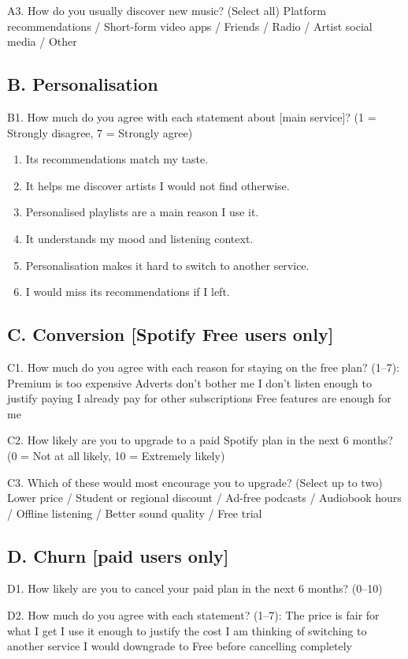 \documentclass[11pt,a4paper]{article}
\begin{document}
A3. How do you usually discover new music? (Select all) Platform recommendations / Short-form video apps / Friends / Radio / Artist social media / Other

\subsection*{B. Personalisation}
B1. How much do you agree with each statement about [main service]? (1 = Strongly disagree, 7 = Strongly agree)

\begin{enumerate}
\item Its recommendations match my taste.
\item It helps me discover artists I would not find otherwise.
\item Personalised playlists are a main reason I use it.
\item It understands my mood and listening context.
\item Personalisation makes it hard to switch to another service.
\item I would miss its recommendations if I left.
\end{enumerate}
\subsection*{C. Conversion [Spotify Free users only]}
C1. How much do you agree with each reason for staying on the free plan? (1–7): Premium is too expensive \textperiodcentered{} Adverts don't bother me \textperiodcentered{} I don't listen enough to justify paying \textperiodcentered{} I already pay for other subscriptions \textperiodcentered{} Free features are enough for me

C2. How likely are you to upgrade to a paid Spotify plan in the next 6 months? (0 = Not at all likely, 10 = Extremely likely)

C3. Which of these would most encourage you to upgrade? (Select up to two) Lower price / Student or regional discount / Ad-free podcasts / Audiobook hours / Offline listening / Better sound quality / Free trial

\subsection*{D. Churn [paid users only]}
D1. How likely are you to cancel your paid plan in the next 6 months? (0–10)

D2. How much do you agree with each statement? (1–7): The price is fair for what I get \textperiodcentered{} I use it enough to justify the cost \textperiodcentered{} I am thinking of switching to another service \textperiodcentered{} I would downgrade to Free before cancelling completely
\end{document}
